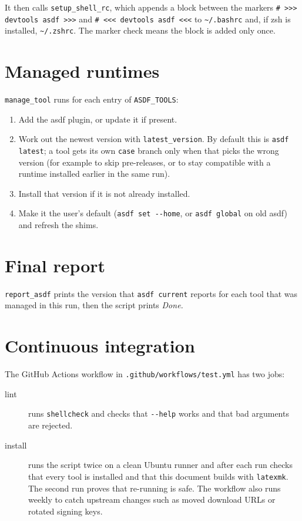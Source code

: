 \documentclass[11pt,a4paper]{article}
\newcommand{\cmd}[1]{\texttt{#1}}
\begin{document}
\noindent It then calls \cmd{setup\_shell\_rc}, which appends a block between the markers
\cmd{\# >>> devtools asdf >>>} and \cmd{\# <<< devtools asdf <<<} to \cmd{\textasciitilde/.bashrc} and,
if zsh is installed, \cmd{\textasciitilde/.zshrc}. The marker check means the block is added only once.

\section{Managed runtimes}
\cmd{manage\_tool} runs for each entry of \cmd{ASDF\_TOOLS}:

\begin{enumerate}
\item Add the asdf plugin, or update it if present.
\item Work out the newest version with \cmd{latest\_version}. By default this is
  \cmd{asdf latest}; a tool gets its own \cmd{case} branch only when that picks the
  wrong version (for example to skip pre-releases, or to stay compatible with a
  runtime installed earlier in the same run).
\item Install that version if it is not already installed.
\item Make it the user's default (\cmd{asdf set -{}-home}, or \cmd{asdf global} on old asdf)
  and refresh the shims.
\end{enumerate}

\section{Final report}
\cmd{report\_asdf} prints the version that \cmd{asdf current} reports for each tool that was
managed in this run, then the script prints \emph{Done.}

\section{Continuous integration}
The GitHub Actions workflow in \cmd{.github/workflows/test.yml} has two jobs:

\begin{description}
\item[lint] runs \cmd{shellcheck} and checks that \cmd{-{}-help} works and that bad arguments
  are rejected.
\item[install] runs the script twice on a clean Ubuntu runner and after each run
  checks that every tool is installed and that this document builds with
  \cmd{latexmk}. The second run proves that re-running is safe. The workflow also
  runs weekly to catch upstream changes such as moved download URLs or rotated
  signing keys.
\end{description}
\end{document}
